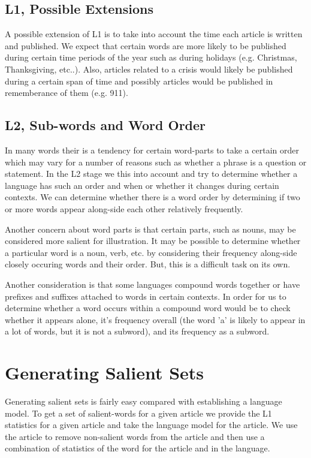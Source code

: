 \documentclass[12pt]{article}
\begin{document}
\subsection{L1, Possible Extensions}
A possible extension of L1 is to take into account the time each article is written and published. We expect that certain words are more likely to be published during certain time periods of the year such as during holidays (e.g. Christmas, Thanksgiving, etc..). Also, articles related to a crisis would likely be published during a certain span of time and possibly articles would be published in rememberance of them (e.g. 911).

\subsection{L2, Sub-words and Word Order}
In many words their is a tendency for certain word-parts to take a certain order which may vary for a number of reasons such as whether a phrase is a question or statement. In the L2 stage we this into account and try to determine whether a language has such an order and when or whether it changes during certain contexts. We can determine whether there is a word order by determining if two or more words appear along-side each other relatively frequently.

Another concern about word parts is that certain parts, such as nouns, may be considered more salient for illustration. It may be possible to determine whether a particular word is a noun, verb, etc. by considering their frequency along-side closely occuring words and their order. But, this is a difficult task on its own.

Another consideration is that some languages compound words together or have prefixes and suffixes attached to words in certain contexts. 
In order for us to determine whether a word occurs within a compound word would be to check whether it appears alone, 
it's frequency overall (the word 'a' is likely to appear in a lot of words, but it is not a subword), and its frequency as a subword.

\section{Generating Salient Sets}
Generating salient sets is fairly easy compared with establishing a language model. To get a set of salient-words for a given article we provide the L1 statistics for a given article and take the language model for the article. We use the article to remove non-salient words from the article and then use a combination of statistics of the word for the article and in the language.
\end{document}
